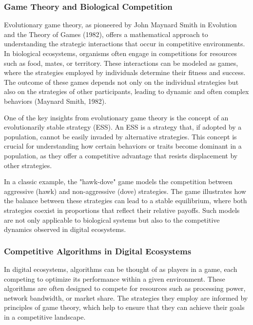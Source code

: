 \documentclass[12pt,twoside]{article}
\begin{document}
\subsubsection{Game Theory and Biological Competition}

Evolutionary game theory, as pioneered by John Maynard Smith in Evolution and the Theory of Games (1982), offers a mathematical approach to understanding the strategic interactions that occur in competitive environments. In biological ecosystems, organisms often engage in competitions for resources such as food, mates, or territory. These interactions can be modeled as games, where the strategies employed by individuals determine their fitness and success. The outcome of these games depends not only on the individual strategies but also on the strategies of other participants, leading to dynamic and often complex behaviors (Maynard Smith, 1982).

One of the key insights from evolutionary game theory is the concept of an evolutionarily stable strategy (ESS). An ESS is a strategy that, if adopted by a population, cannot be easily invaded by alternative strategies. This concept is crucial for understanding how certain behaviors or traits become dominant in a population, as they offer a competitive advantage that resists displacement by other strategies.

In a classic example, the "hawk-dove" game models the competition between aggressive (hawk) and non-aggressive (dove) strategies. The game illustrates how the balance between these strategies can lead to a stable equilibrium, where both strategies coexist in proportions that reflect their relative payoffs. Such models are not only applicable to biological systems but also to the competitive dynamics observed in digital ecosystems.

\subsubsection{Competitive Algorithms in Digital Ecosystems}

In digital ecosystems, algorithms can be thought of as players in a game, each competing to optimize its performance within a given environment. These algorithms are often designed to compete for resources such as processing power, network bandwidth, or market share. The strategies they employ are informed by principles of game theory, which help to ensure that they can achieve their goals in a competitive landscape.
\end{document}
